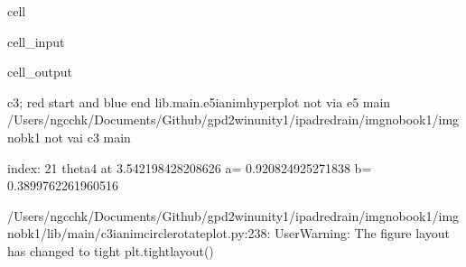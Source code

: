 \documentclass[letterpaper,10pt,english]{jupyterBook}
\begin{document}
\begin{sphinxuseclass}{cell}\begin{sphinxVerbatimInput}

\begin{sphinxuseclass}{cell_input}
\begin{sphinxVerbatim}[commandchars=\\\{\}]
 
 
   
\end{sphinxVerbatim}

\end{sphinxuseclass}\end{sphinxVerbatimInput}
\begin{sphinxVerbatimOutput}

\begin{sphinxuseclass}{cell_output}
\begin{sphinxVerbatim}[commandchars=\\\{\}]
c3; red start and blue end
lib.main.e5\PYGZus{}i\PYGZus{}anim\PYGZus{}hyperplot
not via e5 main
/Users/ngcchk/Documents/Github/gpd2\PYGZhy{}win\PYGZhy{}unity1/ipadred\PYGZhy{}rain/imgno\PYGZus{}book1/imgnobk1
not vai c3 main

index: 21 
theta4 at  3.542198428208626 
 a= \PYGZhy{}0.920824925271838  b= \PYGZhy{}0.3899762261960516 
\end{sphinxVerbatim}

\begin{sphinxVerbatim}[commandchars=\\\{\}]
/Users/ngcchk/Documents/Github/gpd2\PYGZhy{}win\PYGZhy{}unity1/ipadred\PYGZhy{}rain/imgno\PYGZus{}book1/imgnobk1/lib/main/c3\PYGZus{}i\PYGZus{}anim\PYGZus{}circle\PYGZus{}rotate\PYGZus{}plot.py:238: UserWarning: The figure layout has changed to tight
  plt.tight\PYGZus{}layout()
\end{sphinxVerbatim}

\noindent{}

\end{sphinxuseclass}\end{sphinxVerbatimOutput}

\end{sphinxuseclass}
\end{document}

